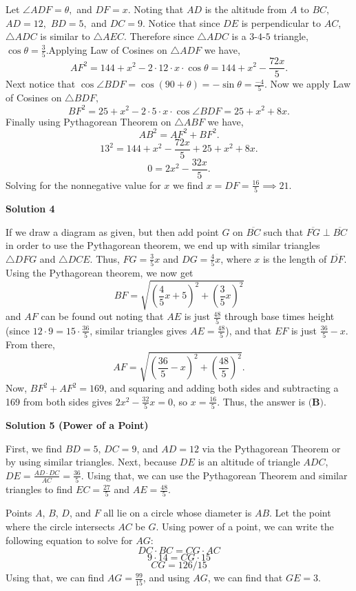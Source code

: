 \begin{enumerate}
Let $\angle{ADF} = \theta,$ and $DF = x.$ Noting that $AD$ is the altitude from $A$ to $BC,$ $AD=12,$ $BD = 5,$ and $DC = 9.$ Notice that since $DE$ is perpendicular to $AC$, $\triangle{ADC}$ is similar to $\triangle{AEC}.$ Therefore since $\triangle{ADC}$ is a $3$-$4$-$5$ triangle, $\cos{\theta}=\frac{3}{5}.$Applying Law of Cosines on $\triangle{ADF}$ we have,
 \[AF^2 = 144+x^2 - 2\cdot 12 \cdot x \cdot \cos{\theta} = 144+x^2 - \frac{72x}{5}.\] Next notice that $\cos{\angle{BDF}} = \cos{(90 + \theta)} = -\sin{\theta} = \frac{-4}{5}.$ Now we apply Law of Cosines on $\triangle{BDF},$
 \[BF^2 = 25 + x^2 - 2 \cdot 5 \cdot x \cdot \cos{\angle{BDF}} = 25 + x^2 + 8x.\]Finally using Pythagorean Theorem on $\triangle{ABF}$ we have, 
 \[AB^2 = AF^2 + BF^2.\] 
 \[13^2 = 144+x^2 - \frac{72x}{5} + 25 + x^2 + 8x.\] 
 \[0 = 2x^2 - \frac{32x}{5}.\] Solving for the nonnegative value for $x$ we find $x = DF = \frac{16}{5} \implies \boxed{21}.$




\textbf{Solution 4}

If we draw a diagram as given, but then add point $G$ on $\overline{BC}$ such that $\overline{FG}\perp\overline{BC}$ in order to use the Pythagorean theorem, we end up with similar triangles $\triangle{DFG}$ and $\triangle{DCE}$. Thus, $FG=\frac35x$ and $DG=\frac45x$, where $x$ is the length of $\overline{DF}$. Using the Pythagorean theorem, we now get 
 \[BF = \sqrt{\left(\frac45x+ 5\right)^2 + \left(\frac35x\right)^2}\] and $AF$ can be found out noting that $AE$ is just $\frac{48}5$ through base times height (since $12\cdot 9 = 15 \cdot \frac{36}5$, similar triangles gives $AE = \frac{48}5$), and that $EF$ is just $\frac{36}5 - x$.  From there, 
 \[AF = \sqrt{\left(\frac{36}5 - x\right)^2 + \left(\frac{48}5\right)^2}.\] Now, $BF^2 + AF^2 = 169$, and squaring and adding both sides and subtracting a 169 from both sides gives $2x^2 - \frac{32}5x = 0$, so $x = \frac{16}5$. Thus, the answer is $\boxed{\textbf{(B)}}$.

 



\textbf{Solution 5 (Power of a Point)}

First, we find $BD = 5$, $DC = 9$, and $AD = 12$ via the Pythagorean Theorem or by using similar triangles. Next, because $DE$ is an altitude of triangle $ADC$, $DE = \frac{AD\cdot DC}{AC} = \frac{36}{5}$. Using that, we can use the Pythagorean Theorem and similar triangles to find $EC = \frac{27}{5}$ and $AE = \frac{48}{5}$. 

 Points $A$, $B$, $D$, and $F$ all lie on a circle whose diameter is $AB$. Let the point where the circle intersects $AC$ be $G$. Using power of a point, we can write the following equation to solve for $AG$: 
 \[DC\cdot BC = CG\cdot AC\] 
 \[9\cdot 14 = CG\cdot 15\] 
 \[CG = 126/15\] Using that, we can find $AG = \frac{99}{15}$, and using $AG$, we can find that $GE = 3$.


\end{enumerate}

